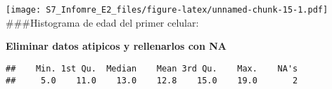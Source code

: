 \documentclass[
]{article}
\newenvironment{Shaded}{\begin{snugshade}}{\end{snugshade}}
\newcommand{\ConstantTok}[1]{\textcolor[rgb]{0.00,0.00,0.00}{#1}}
\newcommand{\DecValTok}[1]{\textcolor[rgb]{0.00,0.00,0.81}{#1}}
\newcommand{\FunctionTok}[1]{\textcolor[rgb]{0.00,0.00,0.00}{#1}}
\newcommand{\NormalTok}[1]{#1}
\newcommand{\OtherTok}[1]{\textcolor[rgb]{0.56,0.35,0.01}{#1}}
\newcommand{\SpecialCharTok}[1]{\textcolor[rgb]{0.00,0.00,0.00}{#1}}
\begin{document}
\texttt{[image: S7\_Infomre\_E2\_files/figure-latex/unnamed-chunk-15-1.pdf]}
\#\#\#Histograma de edad del primer celular:

\textbf{Eliminar datos atipicos y rellenarlos con NA}

\begin{Shaded}
\end{Shaded}

\begin{verbatim}
##    Min. 1st Qu.  Median    Mean 3rd Qu.    Max.    NA's 
##     5.0    11.0    13.0    12.8    15.0    19.0       2
\end{verbatim}
\end{document}
